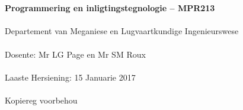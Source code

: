 \begin{titlepage}
    \thispagestyle{empty}
    \\~\\[18cm]
    \large
    \textbf{Programmering en inligtingstegnologie -- MPR213} \\~\\
    Departement van Meganiese en Lugvaartkundige Ingenieurswese \\~\\[0.5cm]
    \normalsize
    Dosente: Mr LG Page en  Mr SM Roux \\~\\
    Laaste Hersiening: 15 Januarie 2017 \\~\\[0.5em]
    \textcopyright \quad Kopiereg voorbehou \\~\\
\end{titlepage}
\restoregeometry
